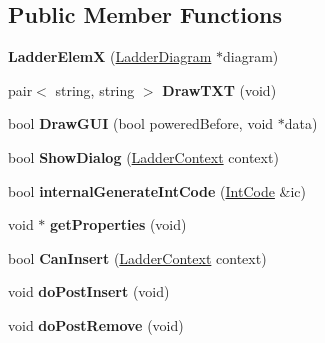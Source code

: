 \subsection*{Public Member Functions}
\begin{DoxyCompactItemize}
\item 
\hypertarget{class_ladder_elem_x_a726b3527dd25b62998689a5bca6c6ffa}{{\bfseries Ladder\-Elem\-X} (\hyperlink{class_ladder_diagram}{Ladder\-Diagram} $\ast$diagram)}\label{class_ladder_elem_x_a726b3527dd25b62998689a5bca6c6ffa}

\item 
\hypertarget{class_ladder_elem_x_a3997e9e51ad4ece4ae549d91734b3ce0}{pair$<$ string, string $>$ {\bfseries Draw\-T\-X\-T} (void)}\label{class_ladder_elem_x_a3997e9e51ad4ece4ae549d91734b3ce0}

\item 
\hypertarget{class_ladder_elem_x_a0d5dc08c9419d9b497aa811d3671e657}{bool {\bfseries Draw\-G\-U\-I} (bool powered\-Before, void $\ast$data)}\label{class_ladder_elem_x_a0d5dc08c9419d9b497aa811d3671e657}

\item 
\hypertarget{class_ladder_elem_x_a074421a0c2ef0d04439df37d1bc0f855}{bool {\bfseries Show\-Dialog} (\hyperlink{struct_ladder_context}{Ladder\-Context} context)}\label{class_ladder_elem_x_a074421a0c2ef0d04439df37d1bc0f855}

\item 
\hypertarget{class_ladder_elem_x_a4ec8e07456fbd7bb196a34d490521aff}{bool {\bfseries internal\-Generate\-Int\-Code} (\hyperlink{class_int_code}{Int\-Code} \&ic)}\label{class_ladder_elem_x_a4ec8e07456fbd7bb196a34d490521aff}

\item 
\hypertarget{class_ladder_elem_x_a87a0c35b8b51796e0382623369dc44ef}{void $\ast$ {\bfseries get\-Properties} (void)}\label{class_ladder_elem_x_a87a0c35b8b51796e0382623369dc44ef}

\item 
\hypertarget{class_ladder_elem_x_aa7745dceaf8a0300e109882253ba9664}{bool {\bfseries Can\-Insert} (\hyperlink{struct_ladder_context}{Ladder\-Context} context)}\label{class_ladder_elem_x_aa7745dceaf8a0300e109882253ba9664}

\item 
\hypertarget{class_ladder_elem_x_a311151da1e6e01dfbb9a66aaa7f5264c}{void {\bfseries do\-Post\-Insert} (void)}\label{class_ladder_elem_x_a311151da1e6e01dfbb9a66aaa7f5264c}

\item 
\hypertarget{class_ladder_elem_x_a9ab46f8d90c4521361c183ade89f8e99}{void {\bfseries do\-Post\-Remove} (void)}\label{class_ladder_elem_x_a9ab46f8d90c4521361c183ade89f8e99}


\end{DoxyCompactItemize}
